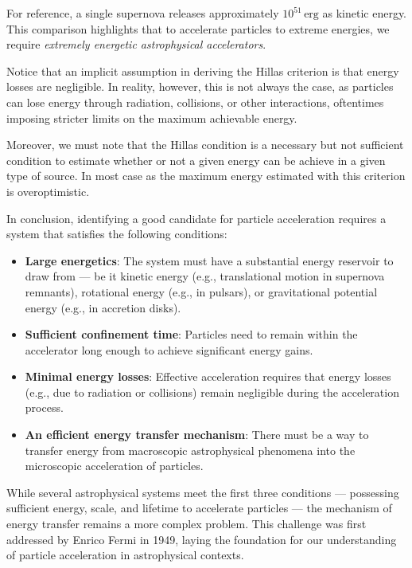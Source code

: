 For reference, a single supernova releases approximately \( 10^{51} \, \text{erg} \) as kinetic energy. This comparison highlights that to accelerate particles to extreme energies, we require \emph{extremely energetic astrophysical accelerators}.

Notice that an implicit assumption in deriving the Hillas criterion is that energy losses are negligible. In reality, however, this is not always the case, as particles can lose energy through radiation, collisions, or other interactions, oftentimes imposing stricter limits on the maximum achievable energy.

Moreover, we must note that the Hillas condition is a necessary but not suﬃcient condition to estimate whether or not a given energy can be achieve in a given type of source. In most case as the maximum energy estimated with this criterion is overoptimistic. 

In conclusion, identifying a good candidate for particle acceleration requires a system that satisfies the following conditions:  
\begin{itemize}
\item \textbf{Large energetics}: The system must have a substantial energy reservoir to draw from --- be it kinetic energy (e.g., translational motion in supernova remnants), rotational energy (e.g., in pulsars), or gravitational potential energy (e.g., in accretion disks).

\item \textbf{Sufficient confinement time}: Particles need to remain within the accelerator long enough to achieve significant energy gains.

\item \textbf{Minimal energy losses}: Effective acceleration requires that energy losses (e.g., due to radiation or collisions) remain negligible during the acceleration process.

\item \textbf{An efficient energy transfer mechanism}: There must be a way to transfer energy from macroscopic astrophysical phenomena into the microscopic acceleration of particles.

\end{itemize}

While several astrophysical systems meet the first three conditions --- possessing sufficient energy, scale, and lifetime to accelerate particles --- the mechanism of energy transfer remains a more complex problem. This challenge was first addressed by Enrico Fermi in 1949, laying the foundation for our understanding of particle acceleration in astrophysical contexts.
